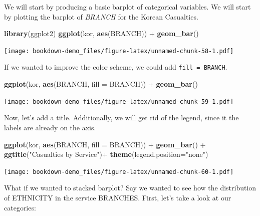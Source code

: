 \documentclass[]{book}
\newenvironment{Shaded}{\begin{snugshade}}{\end{snugshade}}
\newcommand{\KeywordTok}[1]{\textcolor[rgb]{0.13,0.29,0.53}{\textbf{{#1}}}}
\newcommand{\DataTypeTok}[1]{\textcolor[rgb]{0.13,0.29,0.53}{{#1}}}
\newcommand{\StringTok}[1]{\textcolor[rgb]{0.31,0.60,0.02}{{#1}}}
\newcommand{\NormalTok}[1]{{#1}}
\begin{document}
We will start by producing a basic barplot of categorical variables. We
will start by plotting the barplot of \emph{BRANCH} for the Korean
Casualties.

\begin{Shaded}
\begin{Highlighting}[]
\KeywordTok{library}\NormalTok{(ggplot2)}
\KeywordTok{ggplot}\NormalTok{(kor, }\KeywordTok{aes}\NormalTok{(BRANCH)) +}\StringTok{ }\KeywordTok{geom_bar}\NormalTok{()}
\end{Highlighting}
\end{Shaded}

\texttt{[image: bookdown-demo\_files/figure-latex/unnamed-chunk-58-1.pdf]}

If we wanted to improve the color scheme, we could add
\texttt{fill\ =\ BRANCH}.

\begin{Shaded}
\begin{Highlighting}[]
\KeywordTok{ggplot}\NormalTok{(kor, }\KeywordTok{aes}\NormalTok{(BRANCH, }\DataTypeTok{fill =} \NormalTok{BRANCH)) +}\StringTok{ }\KeywordTok{geom_bar}\NormalTok{()}
\end{Highlighting}
\end{Shaded}

\texttt{[image: bookdown-demo\_files/figure-latex/unnamed-chunk-59-1.pdf]}

Now, let's add a title. Additionally, we will get rid of the legend,
since it the labels are already on the axis.

\begin{Shaded}
\begin{Highlighting}[]
\KeywordTok{ggplot}\NormalTok{(kor, }\KeywordTok{aes}\NormalTok{(BRANCH, }\DataTypeTok{fill =} \NormalTok{BRANCH)) +}\StringTok{ }\KeywordTok{geom_bar}\NormalTok{() +}\StringTok{ }
\StringTok{  }\KeywordTok{ggtitle}\NormalTok{(}\StringTok{"Casualties by Service"}\NormalTok{)+}\StringTok{ }\KeywordTok{theme}\NormalTok{(}\DataTypeTok{legend.position=}\StringTok{"none"}\NormalTok{)}
\end{Highlighting}
\end{Shaded}

\texttt{[image: bookdown-demo\_files/figure-latex/unnamed-chunk-60-1.pdf]}

What if we wanted to stacked barplot? Say we wanted to see how the
distribution of ETHNICITY in the service BRANCHES. First, let's take a
look at our categories:

\begin{Shaded}
\end{Shaded}
\end{document}
